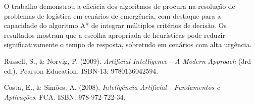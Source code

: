 \documentclass[a4paper,12pt]{scrreprt}
\begin{document}
O trabalho demonstrou a eficácia dos algoritmos de procura na resolução de problemas
de logística em cenários de emergência, com destaque para a capacidade do algoritmo A* 
de integrar múltiplos critérios de decisão. Os resultados mostram que a escolha apropriada
de heurísticas pode reduzir significativamente o tempo de resposta, sobretudo em cenários
com alta urgência.





\renewcommand\bibname{Referências}

\begin{thebibliography}{9}

Russell, S., \& Norvig, P. (2009). \textit{Artificial Intelligence - A Modern Approach} (3rd ed.). Pearson Education. ISBN-13: 9780136042594.

Costa, E., \& Simões, A. (2008). \textit{Inteligência Artificial - Fundamentos e Aplicações}. FCA. ISBN: 978-972-722-34.

\end{thebibliography}


\end{document}
